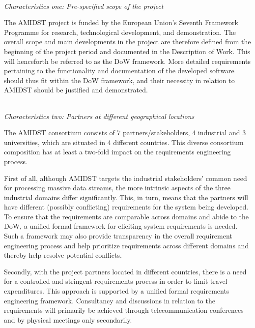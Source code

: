 \ \\
\noindent \emph{Characteristics one:  Pre-specified scope of the project}
\label{sec:characteristic1}

The AMIDST project is funded by the European Union's Seventh Framework Programme for research, technological
development, and demonstration. The overall scope and main developments in the project are therefore defined from the
beginning of the project period and documented in the Description of Work. This will henceforth be referred to
as the DoW framework. More detailed requirements pertaining
to the functionality and documentation of the developed software should thus fit within the DoW framework, and their
necessity in relation to AMIDST should be justified and demonstrated.   


 


\ \\
\noindent \emph{Characteristics two: Partners at different geographical locations}
\label{sec:characteristic2}

The AMIDST consortium consists of 7 partners/stakeholders, 4 industrial and 3 universities, which are situated in 4 different
countries. This diverse consortium composition has at least a two-fold impact on the requirements engineering process.

First of
all, although AMIDST targets the industrial stakeholders' common need for processing massive data streams, the more
intrinsic aspects of the three industrial domains differ significantly. This, in turn, means that the partners will have different
(possibly conflicting) requirements for the system being developed. To ensure that the requirements are comparable
across domains and abide to the DoW, a unified formal framework for eliciting system requirements is needed. Such a
framework may also provide transparency in the overall requirement engineering process and help prioritize requirements
across different domains and thereby help resolve potential conflicts.   

Secondly, with the project partners located in different countries, there is a need for a controlled and stringent requirements
process in order to limit travel expenditures. This approach is supported by a unified formal requirements
engineering framework. Consultancy and discussions in relation to the
requirements will primarily be achieved through telecommunication conferences and by physical meetings only secondarily. 
 
